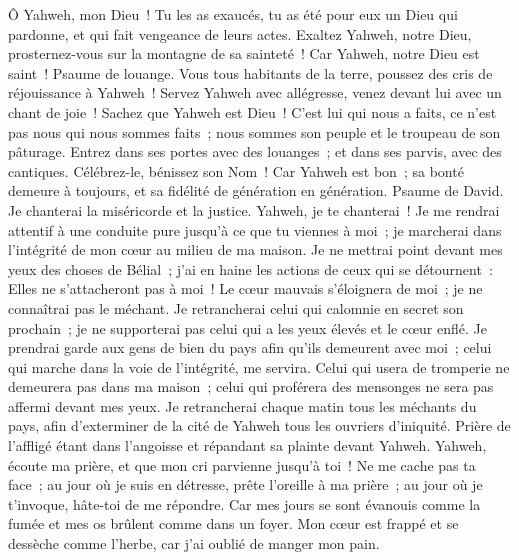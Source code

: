 \begin{multicols}{2}
Ô Yahweh, mon Dieu~! Tu les as exaucés, tu as été pour eux un Dieu qui pardonne, et qui fait vengeance de leurs actes.
Exaltez Yahweh, notre Dieu, prosternez-vous sur la montagne de sa sainteté~! Car Yahweh, notre Dieu est saint~!
\VerseOne{}Psaume de louange. Vous tous habitants de la terre, poussez des cris de réjouissance à Yahweh~!
Servez Yahweh avec allégresse, venez devant lui avec un chant de joie~!
Sachez que Yahweh est Dieu~! C'est lui qui nous a faits, ce n'est pas nous qui nous sommes faits~; nous sommes son peuple et le troupeau de son pâturage.
Entrez dans ses portes avec des louanges~; et dans ses parvis, avec des cantiques. Célébrez-le, bénissez son Nom~!
Car Yahweh est bon~; sa bonté demeure à toujours, et sa fidélité de génération en génération.
\VerseOne{}Psaume de David. Je chanterai la miséricorde et la justice. Yahweh, je te chanterai~!
Je me rendrai attentif à une conduite pure jusqu'à ce que tu viennes à moi~; je marcherai dans l'intégrité de mon cœur au milieu de ma maison.
Je ne mettrai point devant mes yeux des choses de Bélial~; j'ai en haine les actions de ceux qui se détournent~: Elles ne s'attacheront pas à moi~!
Le cœur mauvais s'éloignera de moi~; je ne connaîtrai pas le méchant.
Je retrancherai celui qui calomnie en secret son prochain~; je ne supporterai pas celui qui a les yeux élevés et le cœur enflé.
Je prendrai garde aux gens de bien du pays afin qu'ils demeurent avec moi~; celui qui marche dans la voie de l'intégrité, me servira.
Celui qui usera de tromperie ne demeurera pas dans ma maison~; celui qui proférera des mensonges ne sera pas affermi devant mes yeux.
Je retrancherai chaque matin tous les méchants du pays, afin d'exterminer de la cité de Yahweh tous les ouvriers d'iniquité.
\VerseOne{}Prière de l'affligé étant dans l'angoisse et répandant sa plainte devant Yahweh.
Yahweh, écoute ma prière, et que mon cri parvienne jusqu'à toi~!
Ne me cache pas ta face~; au jour où je suis en détresse, prête l'oreille à ma prière~; au jour où je t'invoque, hâte-toi de me répondre.
Car mes jours se sont évanouis comme la fumée et mes os brûlent comme dans un foyer.
Mon cœur est frappé et se dessèche comme l'herbe, car j'ai oublié de manger mon pain.

\end{multicols}
